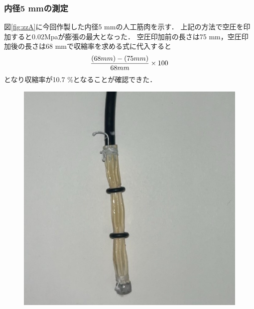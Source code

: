 \subsubsection{内径5 mmの測定}
図\ref{fig:zzA}に今回作製した内径5 mmの人工筋肉を示す．
上記の方法で空圧を印加すると0.02Mpaが膨張の最大となった．
空圧印加前の長さは75 mm，空圧印加後の長さは68 mmで収縮率を求める式に代入すると
$$\frac{(68 mm)-(75 mm)}{68 mm}\times 100\\$$
となり収縮率が10.7 \%となることが確認できた．
\begin{figure}[ht]
    \begin{minipage}{0.49\columnwidth}
      \vspace{4mm}
      \centering
      \includegraphics[scale=0.3]{pic/D.jpg}
   

\end{minipage}
\end{figure}
